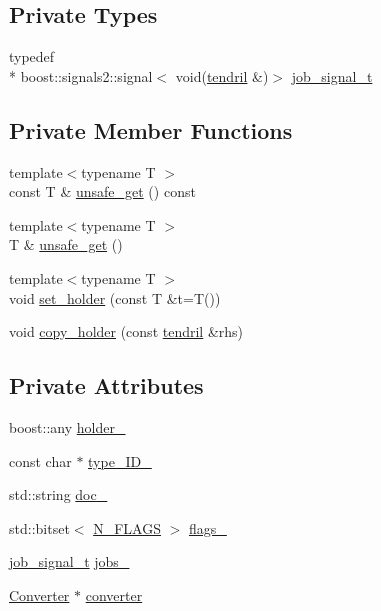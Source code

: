 \subsection*{Private Types}
\begin{DoxyCompactItemize}
\item 
typedef \\*
boost\-::signals2\-::signal$<$ void(\hyperlink{classecto_1_1tendril}{tendril} \&)$>$ \hyperlink{classecto_1_1tendril_a59a62b4ac15de3a6a63a515dace8c420}{job\-\_\-signal\-\_\-t}
\end{DoxyCompactItemize}
\subsection*{Private Member Functions}
\begin{DoxyCompactItemize}
\item 
{\footnotesize template$<$typename T $>$ }\\const T \& \hyperlink{classecto_1_1tendril_a28d02ba43d5ab79639436674ceb4316e}{unsafe\-\_\-get} () const 
\item 
{\footnotesize template$<$typename T $>$ }\\T \& \hyperlink{classecto_1_1tendril_ab3844fa9929e75160b6d8597d1c44cf9}{unsafe\-\_\-get} ()
\item 
{\footnotesize template$<$typename T $>$ }\\void \hyperlink{classecto_1_1tendril_ae8da62875367ec7b906f1f350dff4492}{set\-\_\-holder} (const T \&t=T())
\item 
void \hyperlink{classecto_1_1tendril_a1751ddffc72288bfbd460a559a276a76}{copy\-\_\-holder} (const \hyperlink{classecto_1_1tendril}{tendril} \&rhs)
\end{DoxyCompactItemize}
\subsection*{Private Attributes}
\begin{DoxyCompactItemize}
\item 
boost\-::any \hyperlink{classecto_1_1tendril_a8bc7ae1c22c1af9765284666af02868b}{holder\-\_\-}
\item 
const char $\ast$ \hyperlink{classecto_1_1tendril_a5b237bfa0a9acefc48d577b77380058d}{type\-\_\-\-I\-D\-\_\-}
\item 
std\-::string \hyperlink{classecto_1_1tendril_a6e8304d03aa8a24be843d3bb8d26332d}{doc\-\_\-}
\item 
std\-::bitset$<$ \hyperlink{classecto_1_1tendril_a50eb3613436e99dc4dfa670141ccd91aa8748e76437a722b0cfb3652fefd47d67}{N\-\_\-\-F\-L\-A\-G\-S} $>$ \hyperlink{classecto_1_1tendril_a7b2a11ba7c80606fafda80d34b0a1bfe}{flags\-\_\-}
\item 
\hyperlink{classecto_1_1tendril_a59a62b4ac15de3a6a63a515dace8c420}{job\-\_\-signal\-\_\-t} \hyperlink{classecto_1_1tendril_acf171c75c0ace5cd108e8355ee83199c}{jobs\-\_\-}
\item 
\hyperlink{structecto_1_1tendril_1_1Converter}{Converter} $\ast$ \hyperlink{classecto_1_1tendril_ac4d6bcc7c0f82c7017a9e0c53a942121}{converter}
\end{DoxyCompactItemize}
